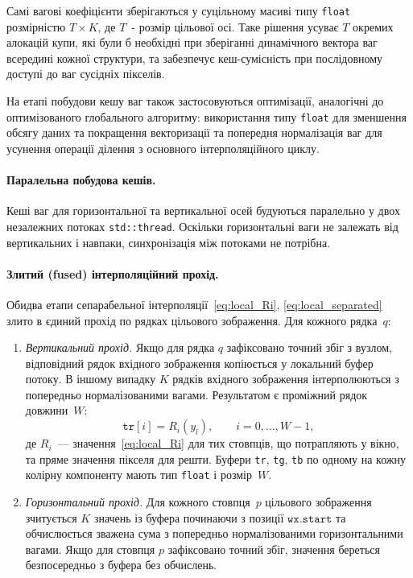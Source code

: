 Самі вагові коефіцієнти зберігаються у суцільному масиві типу
\texttt{float} розмірністю $T \times K$, де $T$~- розмір цільової
осі. Таке рішення усуває $T$ окремих алокацій купи, які були б
необхідні при зберіганні динамічного вектора ваг всередині кожної
структури, та забезпечує кеш-сумісність при послідовному доступі до ваг
сусідніх пікселів.

На етапі побудови кешу ваг також застосовуються оптимізації, аналогічні до оптимізованого глобального алгоритму: використання типу \texttt{float} для зменшення обсягу даних та покращення векторизації та попередня нормалізація ваг для усунення операції ділення з основного інтерполяційного циклу.

\paragraph{Паралельна побудова кешів.}
Кеші ваг для горизонтальної та вертикальної осей будуються паралельно у
двох незалежних потоках \texttt{std::thread}. Оскільки горизонтальні ваги
не залежать від вертикальних і навпаки, синхронізація між потоками не
потрібна.

\paragraph{Злитий (fused) інтерполяційний прохід.}
Обидва етапи сепарабельної інтерполяції~\eqref{eq:local_Ri},
\eqref{eq:local_separated} злито в єдиний прохід по рядках
цільового зображення. Для кожного рядка~$q$:
\begin{enumerate}
	\item \textit{Вертикальний прохід.} Якщо для рядка $q$ зафіксовано
	точний збіг з вузлом, відповідний рядок
	вхідного зображення копіюється у локальний буфер потоку. В іншому
	випадку $K$ рядків вхідного зображення інтерполюються з попередньо
	нормалізованими вагами. Результатом є проміжний рядок довжини~$W$:
	\begin{equation*}
		\texttt{tr}[i] = R_i(y_l), \qquad i = 0, \ldots, W{-}1,
	\end{equation*}
	де $R_i$~--- значення~\eqref{eq:local_Ri} для тих стовпців, що
	потрапляють у вікно, та пряме значення пікселя для решти. Буфери
	\texttt{tr}, \texttt{tg}, \texttt{tb} по одному на кожну колірну
	компоненту мають тип \texttt{float} і розмір~$W$.
	
	\item \textit{Горизонтальний прохід.} Для кожного стовпця~$p$
	цільового зображення зчитується $K$ значень із буфера починаючи з
	позиції $\texttt{wx.start}$ та обчислюється зважена сума з попередньо
	нормалізованими горизонтальними вагами. Якщо для стовпця $p$
	зафіксовано точний збіг, значення береться безпосередньо з буфера без
	обчислень.
\end{enumerate}

